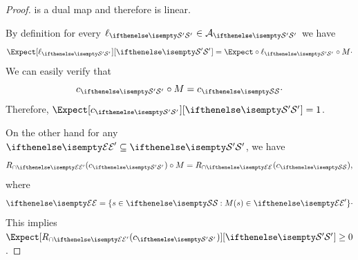 \begin{proof}
    \dualdualMap is a dual map and therefore is linear.

    By definition for every $\act[\sampleSetAlt] \in \actionSet[\sampleSetAlt]$ we have
    \begin{equation*}
        \ExpAlt[{\act[\sampleSetAlt]}] = \Expect \circ \act[\sampleSetAlt] \circ M \cdot
    \end{equation*}
    We can easily verify that
    \begin{equation*}
        \sureAlt \circ M = \sure \cdot
    \end{equation*}
    Therefore, $\ExpAlt[\sureAlt] = 1$.

    On the other hand for any $\eventAlt \subseteq \sampleSetAlt$, we have
    \[
        \rstOp[\eventAlt](\sureAlt) \circ M = \rstOp(\sure),
    \]
    where
    \[
        \event = \{ s \in \sampleSet : M(s) \in \eventAlt \} \cdot
    \]
    This implies  $\ExpAlt[{\rstOp[\eventAlt](\sureAlt)}] \geq 0$.
\end{proof}
